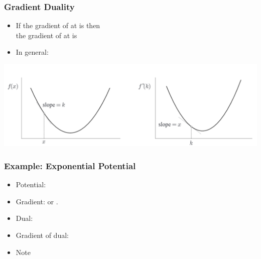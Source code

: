 \documentclass[handout]{beamer}
\begin{document}
\begin{frame}
  \frametitle{Gradient Duality}
  \begin{itemize}
  \item
    If the gradient of  at  is  then\\
    the gradient of  at  is 
    \item In general:
  \end{itemize}
  \includegraphics[width=\textwidth]{figures/SlopeDuality.png}
\end{frame}

\begin{frame}
  \frametitle{Example: Exponential Potential}
  \begin{itemize}
  \item Potential: 
  \item Gradient:  or .
  \item Dual:  
  \item Gradient of dual:  
  \item Note 
   \end{itemize}
 \end{frame}
\end{document}
